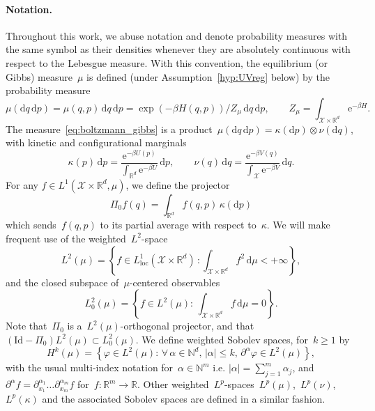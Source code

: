 \documentclass[10pt]{article}
\renewcommand{\d}{\mathrm{d}}
\newcommand{\e}{\mathrm{e}}
\newcommand{\R}{\mathbb{R}}
\newcommand{\cX}{\mathcal{X}}
\newcommand{\wLmu}{L^2(\mu)}
\newcommand{\wLmuz}{L^2_0(\mu)}
\newcommand{\N}{\mathbb N}
\newcommand{\1}{\mathbbm 1}
\newcommand{\dsint}{\displaystyle\int}
\newcommand{\Id}{\mathrm{Id}}
\begin{document}
\paragraph{Notation.}
Throughout this work, we abuse notation and denote probability measures with the same symbol as their densities whenever they are absolutely continuous with respect to the Lebesgue measure.
With this convention, the equilibrium (or Gibbs) measure~$\mu$ is defined (under Assumption~\ref{hyp:UVreg} below) by the probability measure
\begin{equation}
    \label{eq:boltzmann_gibbs}
    \mu(\d q\,\d p) = \mu(q,p)\,\d q\,\d p = \exp\left(-\beta H(q,p)\right)/Z_{\mu}\,\d q\,\d p,\qquad Z_{\mu}=\int_{\cX\times\R^d}\e^{-\beta H}.
\end{equation}
The measure~\eqref{eq:boltzmann_gibbs} is a product~$\mu(\d q\,\d p)=\kappa(\d p)\otimes\nu(\d q)$, with kinetic and configurational marginals
\begin{equation}
    \label{eq:gibbs}
    \kappa(p)\,\d p = \frac{\e^{-\beta U(p)}}{\dsint_{\R^d} \e^{-\beta U}}\,\d p,\qquad \nu(q)\,\d q = \frac{\e^{-\beta V(q)}}{\dsint_\cX \e^{-\beta V}}\,\d q.
\end{equation}
For any $f\in L^1(\cX\times \R^d,\mu)$, we define the projector
\begin{equation}
    \label{eq:kappa_proj}
    \Pi_0 f(q) = \int_{\R^d}f(q,p)\,\kappa(\d p)
\end{equation}
which sends~$f(q,p)$ to its partial average with respect to~$\kappa$. We will make frequent use of the weighted~$L^2$-space
\begin{equation}    
    \wLmu = \left\{f\in L^1_{\mathrm{loc}}(\cX\times\R^d)\,: \int_{\cX\times \R^d}f^2 \,\d \mu < +\infty\right\},
\end{equation}
and the closed subspace of~$\mu$-centered observables
\begin{equation}
    \wLmuz = \left\{f\in \wLmu:\,\int_{\cX\times\R^d}f\,\d\mu = 0\right\}.
\end{equation}
Note that~$\Pi_0$ is a~$\wLmu$-orthogonal projector, and that~${(\Id-\Pi_0)\wLmu \subset \wLmuz}$.
We define weighted Sobolev spaces, for~$k\geq 1$ by
\begin{equation}
    H^k(\mu) = \left\{\varphi\in L^2(\mu):\,\forall\,\alpha\in \N^d,\,|\alpha|\leq k,\,\partial^\alpha\varphi\in L^2(\mu)\right\},
\end{equation}
with the usual multi-index notation for~$\alpha\in \N^m$ i.e. $|\alpha|=\sum_{j=1}^m \alpha_j$, and~$\partial^\alpha f = \partial^{\alpha_1}_{x_1}\dots\partial_{x_m}^{\alpha_m}f$ for~$f:\R^m\to\R$.
Other weighted~$L^p$-spaces~$L^p(\mu)$,~$L^p(\nu)$,~$L^p(\kappa)$ and the associated Sobolev spaces are defined in a similar fashion.
\end{document}

